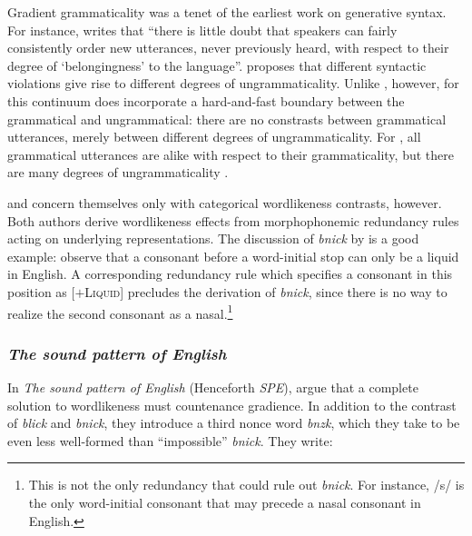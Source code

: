 Gradient grammaticality was a tenet of the earliest work on generative syntax. For instance, \citet[132]{LSLT} writes that ``there is little doubt that speakers can fairly consistently order new utterances, never previously heard, with respect to their degree of `belongingness' to the language''. \citet{ASPECTS} proposes that different syntactic violations give rise to different degrees of ungrammaticality. Unlike \citeauthor{Fischer-Jorgensen1952}, however, for \citeauthor{LSLT} this continuum does incorporate a hard-and-fast boundary between the grammatical and ungrammatical: there are no constrasts between grammatical utterances, merely between different degrees of ungrammaticality. For \citeauthor{LSLT}, all grammatical utterances are alike with respect to their grammaticality, but there are many degrees of ungrammaticality \citep[61]{Schutze1996}.

\citet{SPR,Halle1962} and \citet{Stanley1967} concern themselves only with categorical wordlikeness contrasts, however. Both authors derive wordlikeness effects from morphophonemic redundancy rules acting on underlying representations. The discussion of \emph{bnick} by \citet[101]{Chomsky1965} is a good example: \citeauthor{Chomsky1965} observe that a consonant before a word-initial stop can only be a liquid in English. A corresponding redundancy rule which specifies a consonant in this position as [$+$\textsc{Liquid}] precludes the derivation of \emph{bnick}, since there is no way to realize the second consonant as a nasal.\footnote{This is not the only redundancy that could rule out \emph{bnick}. For instance, /s/ is the only word-initial consonant that may precede a nasal consonant in English.}

\subsubsection{\emph{The sound pattern of English}} 
\label{2spe}

In \emph{The sound pattern of English} (Henceforth \emph{SPE}), \citet{SPE} argue that a complete solution to wordlikeness must countenance gradience. In addition to the contrast of \emph{blick} and \emph{bnick}, they introduce a third nonce word \emph{bnzk}, which they take to be even less well-formed than ``impossible'' \emph{bnick}. They write:


